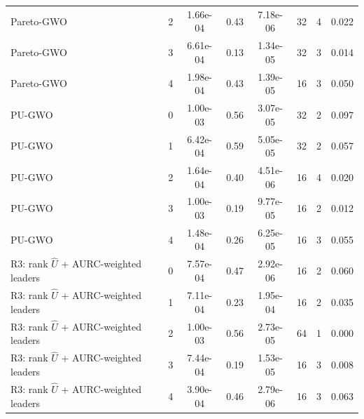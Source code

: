 \begin{table}[t]
\begin{tabular}{lccccccc}
Pareto-GWO & 2 & 1.66e-04 & 0.43 & 7.18e-06 & 32 & 4 & 0.022 \\
Pareto-GWO & 3 & 6.61e-04 & 0.13 & 1.34e-05 & 32 & 3 & 0.014 \\
Pareto-GWO & 4 & 1.98e-04 & 0.43 & 1.39e-05 & 16 & 3 & 0.050 \\
PU-GWO & 0 & 1.00e-03 & 0.56 & 3.07e-05 & 32 & 2 & 0.097 \\
PU-GWO & 1 & 6.42e-04 & 0.59 & 5.05e-05 & 32 & 2 & 0.057 \\
PU-GWO & 2 & 1.64e-04 & 0.40 & 4.51e-06 & 16 & 4 & 0.020 \\
PU-GWO & 3 & 1.00e-03 & 0.19 & 9.77e-05 & 16 & 2 & 0.012 \\
PU-GWO & 4 & 1.48e-04 & 0.26 & 6.25e-05 & 16 & 3 & 0.055 \\
R3: rank $\hat{U}$ + AURC-weighted leaders & 0 & 7.57e-04 & 0.47 & 2.92e-06 & 16 & 2 & 0.060 \\
R3: rank $\hat{U}$ + AURC-weighted leaders & 1 & 7.11e-04 & 0.23 & 1.95e-04 & 16 & 2 & 0.035 \\
R3: rank $\hat{U}$ + AURC-weighted leaders & 2 & 1.00e-03 & 0.56 & 2.73e-05 & 64 & 1 & 0.000 \\
R3: rank $\hat{U}$ + AURC-weighted leaders & 3 & 7.44e-04 & 0.19 & 1.53e-05 & 16 & 3 & 0.008 \\
R3: rank $\hat{U}$ + AURC-weighted leaders & 4 & 3.90e-04 & 0.46 & 2.79e-06 & 16 & 3 & 0.063 \\
\bottomrule
\end{tabular}
\end{table}
